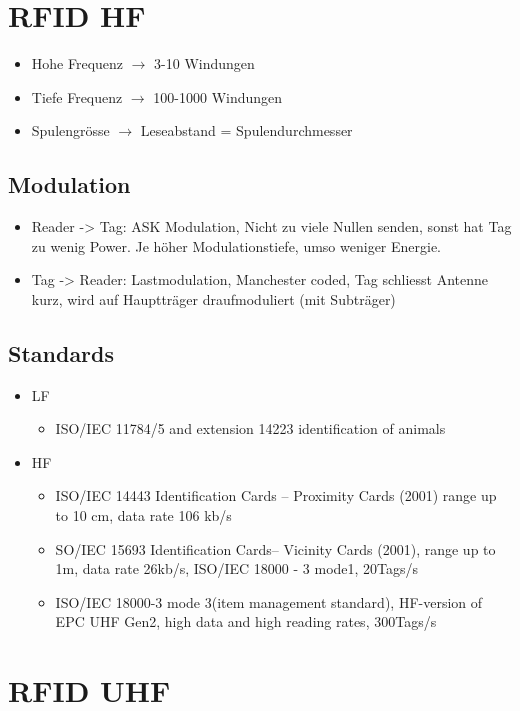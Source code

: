 \section{RFID HF}
	\begin{itemize}
		\item Hohe Frequenz $\rightarrow$ 3-10 Windungen
		\item Tiefe Frequenz $\rightarrow$ 100-1000 Windungen
		\item Spulengrösse $\rightarrow$ Leseabstand = Spulendurchmesser
	\end{itemize}
\subsection{Modulation}
	\begin{itemize}
		\item Reader -> Tag: ASK Modulation, Nicht zu viele Nullen senden, sonst hat Tag zu wenig Power. Je höher Modulationstiefe, umso weniger Energie. 
		\item Tag -> Reader: Lastmodulation, Manchester coded, Tag schliesst Antenne kurz, wird auf Hauptträger draufmoduliert (mit Subträger)
	\end{itemize}
\subsection{Standards}
	\begin{itemize}
		\item LF
			\begin{itemize}
				\item ISO/IEC 11784/5 and extension 14223 identification of animals
			\end{itemize} 
		\item HF
			\begin{itemize}
				\item ISO/IEC 14443
				Identification Cards – Proximity Cards (2001) range up to 10 cm, data rate 106 kb/s
				\item SO/IEC 15693
				Identification Cards– Vicinity Cards (2001), range up to 1m, data rate 26kb/s, ISO/IEC 18000 - 3 mode1, 20Tags/s
				\item ISO/IEC 18000-3 mode 3(item management standard), HF-version of EPC UHF Gen2, high data and high reading rates, 300Tags/s
				
				
				
			\end{itemize}
	\end{itemize}
\section{RFID UHF}
